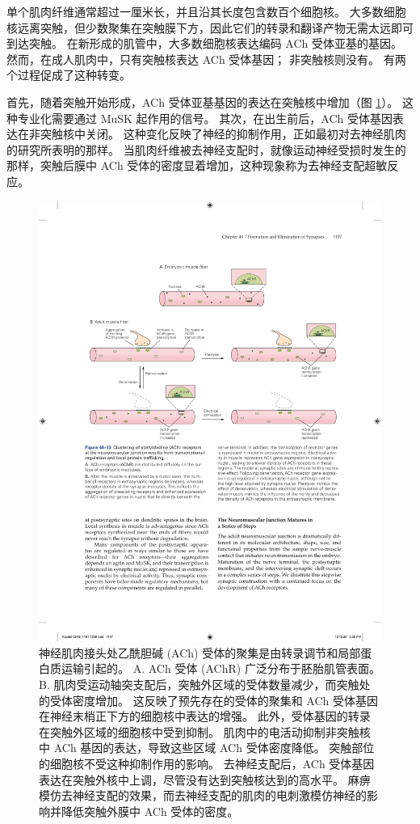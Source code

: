 单个肌肉纤维通常超过一厘米长，并且沿其长度包含数百个细胞核。 大多数细胞核远离突触，但少数聚集在突触膜下方，因此它们的转录和翻译产物无需太远即可到达突触。 在新形成的肌管中，大多数细胞核表达编码 ACh 受体亚基的基因。 然而，在成人肌肉中，只有突触核表达 ACh 受体基因； 非突触核则没有。 有两个过程促成了这种转变。

首先，随着突触开始形成，ACh 受体亚基基因的表达在突触核中增加（图 \ref{fig:48_13}）。 
这种专业化需要通过 MuSK 起作用的信号。 其次，在出生前后，ACh 受体基因表达在非突触核中关闭。 这种变化反映了神经的抑制作用，正如最初对去神经肌肉的研究所表明的那样。 当肌肉纤维被去神经支配时，就像运动神经受损时发生的那样，突触后膜中 ACh 受体的密度显着增加，这种现象称为去神经支配超敏反应。

\begin{figure}[htbp]
	\centering
	\includegraphics[width=0.9\linewidth]{chap48/fig_48_13}
	\caption{神经肌肉接头处乙酰胆碱 (ACh) 受体的聚集是由转录调节和局部蛋白质运输引起的。 A. ACh 受体 (AChR) 广泛分布于胚胎肌管表面。 B. 肌肉受运动轴突支配后，突触外区域的受体数量减少，而突触处的受体密度增加。 这反映了预先存在的受体的聚集和 ACh 受体基因在神经末梢正下方的细胞核中表达的增强。 此外，受体基因的转录在突触外区域的细胞核中受到抑制。 肌肉中的电活动抑制非突触核中 ACh 基因的表达，导致这些区域 ACh 受体密度降低。 突触部位的细胞核不受这种抑制作用的影响。 去神经支配后，ACh 受体基因表达在突触外核中上调，尽管没有达到突触核达到的高水平。 麻痹模仿去神经支配的效果，而去神经支配的肌肉的电刺激模仿神经的影响并降低突触外膜中 ACh 受体的密度。}
	\label{fig:48_13}
\end{figure}

